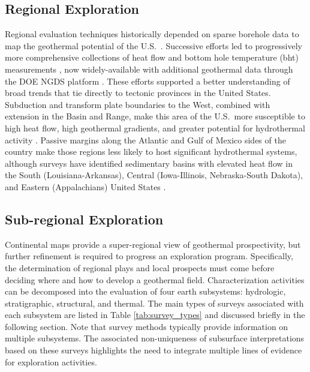 \subsection{Regional Exploration}\label{ch2:regional_expl}
Regional evaluation techniques historically depended on sparse borehole data to map the geothermal potential of the U.S.\ \citep{kehle_aapg_1970}. Successive efforts led to progressively more comprehensive collections of heat flow and bottom hole temperature (\acrshort{bht}) measurements \citep{blackwell_heat_1990, blackwell_temperature-at-depth_2011, muffler_assessment_1979, sorey_low-temperature_1983, wisian_heat_1999}, now widely-available with additional geothermal data through the DOE NGDS platform \citep{anderson_national_2013}. These efforts supported a better understanding of broad trends that tie directly to tectonic provinces in the United States. Subduction and transform plate boundaries to the West, combined with extension in the Basin and Range, make this area of the U.S.\ more susceptible to high heat flow, high geothermal gradients, and greater potential for hydrothermal activity \citep{mariner_low-temperature_1983}. Passive margins along the Atlantic and Gulf of Mexico sides of the country make those regions less likely to host significant hydrothermal systems, although surveys have identified sedimentary basins with elevated heat flow in the South (Louisiana-Arkansas), Central (Iowa-Illinois, Nebraska-South Dakota), and Eastern (Appalachians) United States \citep{blackwell_geothermal_1995, sorey_low-temperature_1983}.

\subsection{Sub-regional Exploration}\label{ch2:sub_regional_expl}
Continental maps provide a super-regional view of geothermal prospectivity, but further refinement is required to progress an exploration program. Specifically, the determination of regional plays and local prospects must come before deciding where and how to develop a geothermal field. Characterization activities can be decomposed into the evaluation of four earth subsystems: hydrologic, stratigraphic, structural, and thermal. The main types of surveys associated with each subsystem are listed in Table \ref{tab:survey_types} and discussed briefly in the following section. Note that survey methods typically provide information on multiple subsystems. The associated non-uniqueness of subsurface interpretations based on these surveys highlights the need to integrate multiple lines of evidence for exploration activities. 

